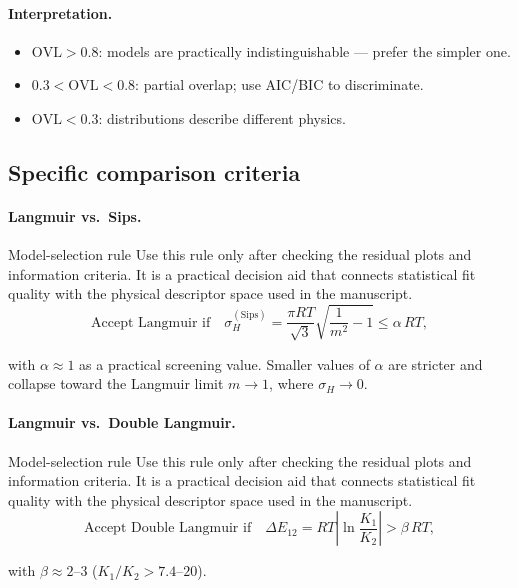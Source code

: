 \documentclass[journal=jacsat,manuscript=article]{achemso}
\begin{document}
\paragraph{Interpretation.}
\begin{itemize}
	\item $\mathrm{OVL} > 0.8$: models are practically
	indistinguishable --- prefer the simpler one.
	\item $0.3 < \mathrm{OVL} < 0.8$: partial overlap; use AIC/BIC
	to discriminate.
	\item $\mathrm{OVL} < 0.3$: distributions describe different
	physics.
\end{itemize}

\subsection{Specific comparison criteria}
\label{sec:si_comparison_criteria}

\paragraph{Langmuir vs.\ Sips.}
\begin{bluebox}{Model-selection rule}
	Use this rule only after checking the residual plots and information criteria. It is a practical decision aid that connects statistical fit quality with the physical descriptor space used in the manuscript.
\begin{equation}
	\text{Accept Langmuir if}\quad
		\sigma_H^{\mathrm{(Sips)}}
		= \frac{\pi RT}{\sqrt{3}}\sqrt{\frac{1}{m^2}-1} \leq \alpha\,RT,
	\label{eq:si_criterion_LvsS}
\end{equation}
\end{bluebox}
with $\alpha \approx 1$ as a practical screening value. Smaller
values of $\alpha$ are stricter and collapse toward the Langmuir limit
$m \to 1$, where $\sigma_H \to 0$.

\paragraph{Langmuir vs.\ Double Langmuir.}
\begin{bluebox}{Model-selection rule}
	Use this rule only after checking the residual plots and information criteria. It is a practical decision aid that connects statistical fit quality with the physical descriptor space used in the manuscript.
\begin{equation}
	\text{Accept Double Langmuir if}\quad
		\Delta E_{12} = RT\left|\ln\frac{K_1}{K_2}\right| > \beta\,RT,
	\label{eq:si_criterion_LvsDL}
\end{equation}
\end{bluebox}
with $\beta \approx 2$--$3$ ($K_1/K_2 > 7.4$--$20$).
\end{document}
